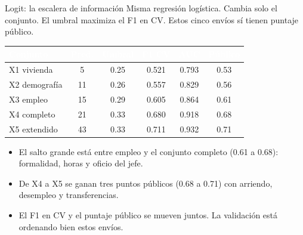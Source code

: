 \documentclass[aspectratio=169,10pt]{beamer}
\newcommand{\mejor}{\rowcolor{uniandesYellow}}
\newcommand{\fila}{\rowcolor{rowAlt}}
\newcommand{\hh}[1]{\cellcolor{uniandesInk}\textcolor{white}{\textbf{#1}}}
\begin{document}
\begin{frame}{Logit: la escalera de información}
  Misma regresión logística. Cambia solo el conjunto. El umbral maximiza el F1 en CV. Estos cinco envíos sí tienen puntaje público.
  \vspace{0.4em}
  \footnotesize
  \begin{center}
  \begin{tabular}{@{}lccccc@{}}
    \toprule
    \hh{Conjunto} & \hh{Pred.} & \hh{Umbral} & \hh{F1 CV} & \hh{AUC} & \hh{Público} \\
    \midrule
    X1 vivienda    & 5  & 0.25 & 0.521 & 0.793 & 0.53 \\
    \fila X2 demografía & 11 & 0.26 & 0.557 & 0.829 & 0.56 \\
    X3 empleo      & 15 & 0.29 & 0.605 & 0.864 & 0.61 \\
    \fila X4 completo   & 21 & 0.33 & 0.680 & 0.918 & 0.68 \\
    \mejor X5 extendido & 43 & 0.33 & 0.711 & 0.932 & 0.71 \\
    \bottomrule
  \end{tabular}
  \end{center}
  \vspace{0.45em}
  \begin{itemize}
    \item El salto grande está entre empleo y el conjunto completo (0.61 a 0.68): formalidad, horas y oficio del jefe.
    \item De X4 a X5 se ganan tres puntos públicos (0.68 a 0.71) con arriendo, desempleo y transferencias.
    \item El F1 en CV y el puntaje público se mueven juntos. La validación está ordenando bien estos envíos.
  \end{itemize}
\end{frame}
\end{document}

